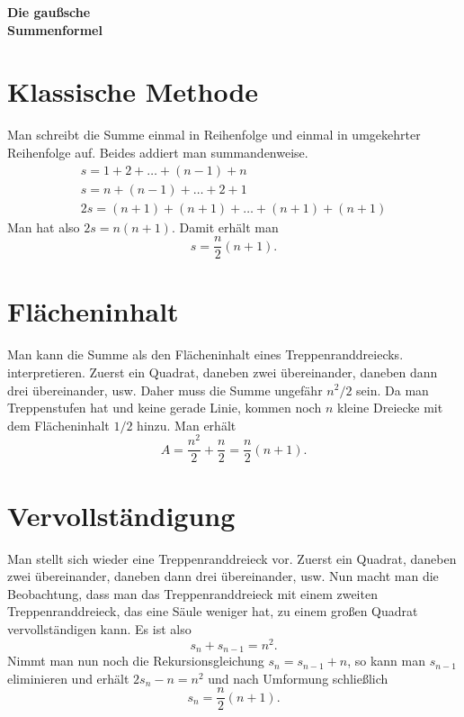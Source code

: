 \documentclass[a4paper,10pt,fleqn,twocolumn,twoside]{article}
\begin{document}
\thispagestyle{empty}

\begin{huge}
\noindent
\textbf{Die gaußsche\\
Summenformel}
\par
\end{huge}


\section{Klassische Methode}

Man schreibt die Summe einmal in Reihenfolge und einmal in umgekehrter Reihenfolge auf. Beides addiert man summandenweise.
\begin{gather*}
s = 1+2+\ldots+(n-1)+n\\
s = n+(n-1)+\ldots+2+1\\
2s = (n+1)+(n+1)+\ldots+(n+1)+(n+1)
\end{gather*}
Man hat also \(2s=n(n+1)\). Damit erhält man
\[s = \frac{n}{2}(n+1).\]


\section{Flächeninhalt}

Man kann die Summe als den Flächeninhalt eines Treppenranddreiecks.
interpretieren. Zuerst ein Quadrat, daneben zwei übereinander,
daneben dann drei übereinander, usw.
Daher muss die Summe ungefähr \(n^2/2\) sein. Da man Treppenstufen
hat und keine gerade Linie, kommen noch \(n\) kleine Dreiecke mit
dem Flächeninhalt \(1/2\) hinzu. Man erhält
\[A = \frac{n^2}{2}+\frac{n}{2} = \frac{n}{2}(n+1).\]


\section{Vervollständigung}

Man stellt sich wieder eine Treppenranddreieck vor.
Zuerst ein Quadrat, daneben zwei übereinander, daneben dann drei übereinander, usw.
Nun macht man die Beobachtung, dass man das Treppenranddreieck mit
einem zweiten Treppenranddreieck, das eine Säule weniger hat,
zu einem großen Quadrat vervollständigen kann. Es ist also
\[s_n+s_{n-1} = n^2.\]
Nimmt man nun noch die Rekursionsgleichung \(s_{n}=s_{n-1}+n\),
so kann man \(s_{n-1}\) eliminieren und erhält \(2s_n-n = n^2\)
und nach Umformung schließlich
\[s_n = \frac{n}{2}(n+1).\]
\end{document}
